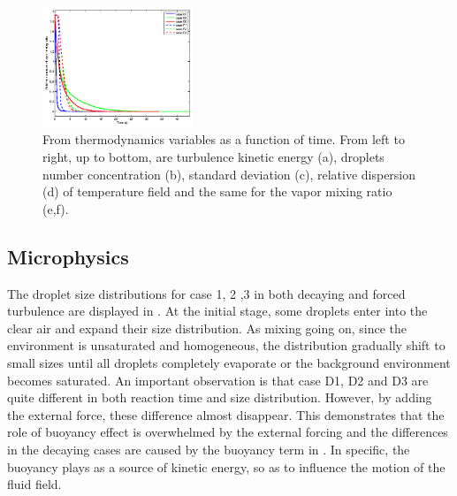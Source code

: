 \begin{figure}[!htbp]
\includegraphics[width=0.4\textwidth]{Figures/vapor_dsp}
\caption{From thermodynamics variables as a function of time. From left to right, 
up to bottom, are turbulence kinetic energy (a), droplets number 
concentration (b), standard deviation (c), relative dispersion (d) of 
temperature field and the same for the vapor mixing ratio (e,f).}\label{fig:therm_dynam} 
\end{figure}

\subsection{Microphysics}
The droplet size distributions for case 1, 2 ,3 in both decaying and forced
turbulence are displayed in . At the initial stage, some
droplets enter into the clear air and expand their size distribution. As mixing
going on, since the environment is unsaturated and homogeneous, the
distribution gradually shift to small sizes until all droplets completely
evaporate or the background environment becomes saturated.  An important
observation is that case D1, D2 and D3 are quite different in both reaction
time and size distribution. However, by adding the external force, these
difference almost disappear. This demonstrates that the role of buoyancy effect
is overwhelmed by the external forcing and the differences in the decaying
cases are caused by the buoyancy term in . In specific, the
buoyancy plays as a source of kinetic energy, so as to influence the motion of
the fluid field.  

\begin{figure}[H]\centering
{}
\end{figure}

